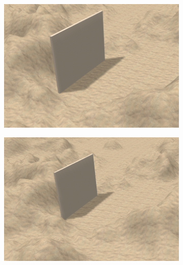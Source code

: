 \begin{figure}[H]
    \centering
    \caption{Cenários criados para realizar o experimento.}
    \label{fig:scenaries}
    \begin{subfigure}[t]{0.328\textwidth}
        \includegraphics[width=\textwidth]{dados/figuras/scene3.png}
        \caption{}
        \label{fig:scene2}
    \end{subfigure}
    \begin{subfigure}[t]{0.328\textwidth}
        \includegraphics[width=\textwidth]{dados/figuras/scene2.png}
        \caption{}
        \label{fig:scene1}
    \end{subfigure}
    \begin{subfigure}[t]{0.328\textwidth}

\end{subfigure}
\end{figure}
